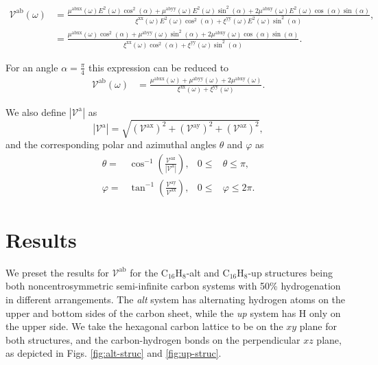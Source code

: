 \documentclass[prb,11pt,tightenlines,twocolumn,aps]{revtex4-1}
\begin{document}
\begin{widetext}
\begin{align}
\mathcal{V}^{\mathrm{ab}} (\omega) 
&= \frac{\mu^{\mathrm{abxx}}(\omega)
E^{2}(\omega)\cos^{2}(\alpha) + 
\mu^{\mathrm{abyy}}(\omega)
E^{2}(\omega)\sin^{2}(\alpha) + 
2\mu^{\mathrm{abxy}}(\omega)
E^{2}(\omega)\cos(\alpha)\sin(\alpha)}
{\xi^{\mathrm{xx}}(\omega)
E^{2}(\omega)\cos^{2}(\alpha) + 
\xi^{\mathrm{yy}}(\omega)
E^{2}(\omega)\sin^{2}(\alpha)},
\nonumber \\
&= \frac{\mu^{\mathrm{abxx}}(\omega)\cos^{2}(\alpha) + 
\mu^{\mathrm{abyy}}(\omega)\sin^{2}(\alpha) + 
2\mu^{\mathrm{abxy}}(\omega)\cos(\alpha)\sin(\alpha)}
{\xi^{\mathrm{xx}}(\omega)\cos^{2}(\alpha) + 
\xi^{\mathrm{yy}}(\omega)\sin^{2}(\alpha)}.
\label{eq:vab}
\end{align}
\end{widetext}

For an angle $\alpha = \frac{\pi}{4}$ this expression can be reduced to 
\begin{align}
\mathcal{V}^{\mathrm{ab}} (\omega)
&= \frac{\mu^{\mathrm{abxx}}(\omega) + \mu^{\mathrm{abyy}}(\omega) + 
2\mu^{\mathrm{abxy}}(\omega)}
{\xi^{\mathrm{xx}}(\omega) + \xi^{\mathrm{yy}}(\omega)}.
\label{eq:vab-90deg}
\end{align}

We also define $|\mathcal{V}^{\mathrm{a}}|$ as 
\begin{equation}\label{eq:va-mag}
|\mathcal{V}^{\mathrm{a}}| = 
\sqrt {
(\mathcal{V}^{\mathrm{ax}})^{2} +
(\mathcal{V}^{\mathrm{ay}})^{2} +
(\mathcal{V}^{\mathrm{az}})^{2} 
},
\end{equation}
and the corresponding polar and azimuthal angles $\theta$ and $\varphi$ as
\begin{align}
\theta  =& \cos^{-1} \left( \frac{\mathcal{V}^{\mathrm{az}}}
{|\mathcal{V}^{\mathrm{a}}|} \right),
& 0 \leq &\theta \leq \pi, 
\label{eq:polar-ang}
\\
\varphi =& \tan^{-1} \left( \frac{\mathcal{V}^{\mathrm{ay}}}
{\mathcal{V}^{\mathrm{ax}}} \right),
& 0 \leq &\varphi \leq 2\pi.
\label{eq:azimuthal-ang} 
\end{align}


\section{Results} %
\label{sec:results}


We preset the results for $\mathcal{V}^{\mathrm{ab}}$ for the
C$_{16}$H$_{8}$-alt and C$_{16}$H$_{8}$-up structures being both
noncentrosymmetric semi-infinite carbon systems with 50\% hydrogenation in
different arrangements. The \emph{alt} system has alternating hydrogen atoms on
the upper and bottom sides of the carbon sheet, while the \emph{up} system has H
only on the upper side. We take the hexagonal carbon lattice to be on the $xy$
plane for both structures, and the carbon-hydrogen bonds on the perpendicular
$xz$ plane, as depicted in Figs.
\ref{fig:alt-struc} and \ref{fig:up-struc}.
\end{document}
